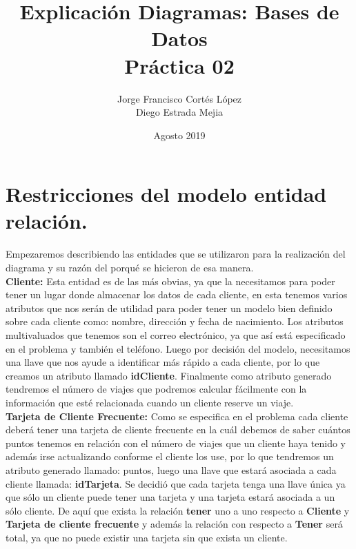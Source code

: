 \documentclass{article}
\title{Explicación Diagramas: Bases de Datos\\
Práctica 02}
\author{Jorge Francisco Cortés López\\
Diego Estrada Mejia}
\date{Agosto 2019}
\begin{document}
\maketitle

\section{Restricciones del modelo entidad relación.}
Empezaremos describiendo las entidades que se utilizaron para la realización del diagrama y su razón del porqué se hicieron de esa manera.\\
\textbf{Cliente:} Esta entidad es de las más obvias, ya que la necesitamos para poder tener un lugar donde almacenar los datos de cada cliente, en esta tenemos varios atributos que nos serán de utilidad para poder tener un modelo bien definido sobre cada cliente como: nombre, dirección y fecha de nacimiento. Los atributos multivaluados que tenemos son el correo electrónico, ya que así está especificado en el problema y también el teléfono. Luego por decisión del modelo, necesitamos una llave que nos ayude a identificar más rápido a cada cliente, por lo que creamos un atributo llamado \textbf{idCliente}. Finalmente como atributo generado tendremos el número de viajes que podremos calcular fácilmente con la información que esté relacionada cuando un cliente reserve un viaje.\\
\textbf{Tarjeta de Cliente Frecuente:} Como se especifica en el problema cada cliente deberá tener una tarjeta de cliente frecuente en la cuál debemos de saber cuántos puntos tenemos en relación con el número de viajes que un cliente haya tenido y además irse actualizando conforme el cliente los use, por lo que tendremos un atributo generado llamado: puntos, luego una llave que estará asociada a cada cliente llamada: \textbf{idTarjeta}. Se decidió que cada tarjeta tenga una llave única ya que sólo un cliente puede tener una tarjeta y una tarjeta estará asociada a un sólo cliente. De aquí que exista la relación \textbf{tener} uno a uno respecto a \textbf{Cliente} y \textbf{Tarjeta de cliente frecuente} y además la relación con respecto a \textbf{Tener} será total, ya que no puede existir una tarjeta sin que exista un cliente.\\
\end{document}
